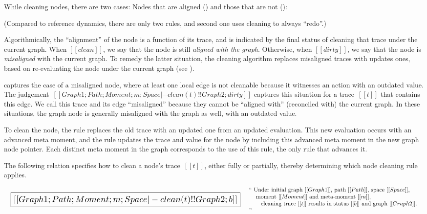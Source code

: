 \documentclass[11pt]{article}
\begin{document}
While cleaning nodes, there are two cases: Nodes that are aligned
() and those that are not ():

\begin{mathpar}
\end{mathpar}

(Compared to reference dynamics, there are only two rules, and second one uses cleaning to always ``redo''.)

Algorithmically, the ``alignment'' of the node is a function of its trace, and is indicated by the final status of cleaning that trace under the current graph.
%
When $[[clean]]$, we say that the node is still \emph{aligned with the graph}.
Otherwise, when $[[dirty]]$, we say that the node is \emph{misaligned} with the current graph.
%
To remedy the latter situation, the cleaning algorithm replaces misaligned traces with updates ones,
based on re-evaluating the node under the current graph (see ).
%

 captures the case of a misaligned node, where at least one
local edge is not cleanable because it witnesses an action with an
outdated value.
%
The judgement~$[[Graph1; Path; Moment; m; Space |- clean(t) !!
    Graph2; dirty]]$ captures this situation for a trace~$[[t]]$ that contains this edge.
%
We call this trace and its edge ``misaligned'' because they cannot be ``aligned with''
(reconciled with) the current graph.
%
In these situations, the graph node is generally misaligned with the graph as well, with an outdated value.

To clean the node, the rule replaces the old trace with an updated one
from an updated evaluation.
%
This new evaluation occurs with an advanced meta moment, and the rule
updates the trace and value for the node by including this advanced
meta moment in the new graph node pointer.
%
Each distinct meta moment in the graph corresponds to the use of this
rule, the only rule that advances it.


The following relation specifies how to clean a node's trace~$[[t]]$, either fully or partially,
thereby determining which node cleaning rule applies.

\[
\begin{array}{lc}
  {\scalebox{1.5}{
  \boxed{[[Graph1; Path; Moment; m; Space |- clean(t) !! Graph2; b]]}}}
&
\begin{array}{p{4in}}
  ``
  Under initial graph~$[[Graph1]]$,
  path~$[[Path]]$,
  space~$[[Space]]$,\\
  \hspace{3mm}~moment~$[[Moment]]$ and meta-moment~$[[m]]$,\\
  \hspace{6mm}~cleaning trace~$[[t]]$
  results in status~$[[b]]$ and graph~$[[Graph2]]$.
  ''
\end{array}
\end{array}
\]
\end{document}
